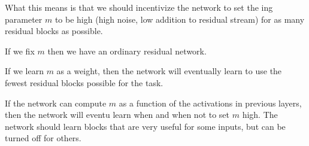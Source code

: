 \documentclass{article}
\begin{document}
What this means is that we should incentivize the network to set the ing parameter $m$ to be high (high noise, low addition to residual stream) for as many residual blocks as possible.

If we fix $m$ then we have an ordinary residual network.

If we learn $m$ as a weight, then the network will eventually learn to use the fewest residual blocks possible for the task.

If the network can compute $m$ as a function of the activations in previous layers, then the network will eventu learn when and when not to set $m$ high. The network should learn blocks that are very useful for some inputs, but can be turned off for others.

\printbibliography
\end{document}
